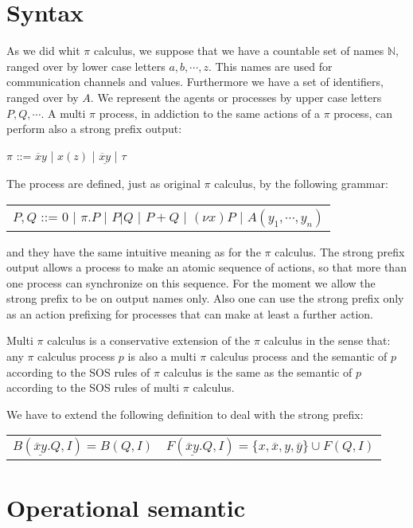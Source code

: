 
\section{Syntax}
As we did whit $\pi$ calculus, we suppose that we have a countable set of names $\mathbb{N}$, ranged over by lower case letters $a,b, \cdots, z$. This names are used for communication channels and values. Furthermore we have a set of identifiers, ranged over by $A$. We represent the agents or processes by upper case letters $P,Q, \cdots $. A multi $\pi$ process, in addiction to the same actions of a $\pi$ process, can perform also a strong prefix output:
\begin{center}
  $\pi$ ::= $\overline{x}y$ | $x(z)$ | $\underline{\overline{x}y}$ | $\tau$ 
\end{center}
The process are defined, just as original $\pi$ calculus, by the following grammar:
\begin{center}
  \begin{tabular}{l}
    $P,Q$ ::= $0$ | $\pi.P$ | $P|Q$ | $P+Q$ | $(\nu x) P$ | $A(y_{1}, \cdots, y_{n})$
  \end{tabular}
\end{center}
and they have the same intuitive meaning as for the $\pi$ calculus. The strong prefix output allows a process to make an atomic sequence of actions, so that more than one process can synchronize on this sequence. For the moment we allow the strong prefix to be on output names only. Also one can use the strong prefix only as an action prefixing for processes that can make at least a further action. 

Multi $\pi$ calculus is a conservative extension of the $\pi$ calculus in the sense that: any $\pi$ calculus process $p$ is also a multi $\pi$ calculus process and the semantic of $p$ according to the SOS rules of $\pi$ calculus is the same as the semantic of $p$ according to the SOS rules of multi $\pi$ calculus. 

We have to extend the following definition to deal with the strong prefix:
\begin{center}
  \begin{tabular}{ll}
	$B(\underline{\overline{x}y}.Q, I) = B(Q,I)$
      &
	$F(\underline{\overline{x}y}.Q, I) = \{x,\overline{x},y,\overline{y}\}\cup F(Q, I)$
    \\
  \end{tabular}
\end{center}


\section{Operational semantic}
